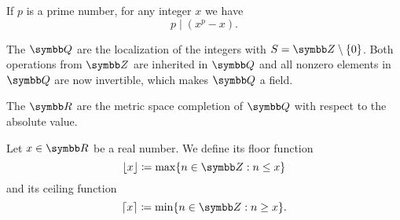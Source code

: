 \begin{proposition}\label{thm:fermats_little_theorem}
  If \( p \) is a prime number, for any integer \( x \) we have
  \begin{equation*}
    p \mid (x^p - x).
  \end{equation*}
\end{proposition}

\begin{definition}\label{def:rational_numbers}
  The  \( \Q \) are the localization of the integers with \( S = \Z \setminus \{ 0 \} \). Both operations from \( \Z \) are inherited in \( \Q \) and all nonzero elements in \( \Q \) are now invertible, which makes \( \Q \) a field.
\end{definition}

\begin{definition}\label{def:real_numbers}
  The  \( \R \) are the metric space completion of \( \Q \) with respect to the absolute value.
\end{definition}

\begin{definition}\label{def:floor_ceiling_functions}
  Let \( x \in \R \) be a real number. We define its floor function
  \begin{equation*}
    \lfloor x \rfloor \coloneqq \max \{ n \in \Z : n \leq x \}
  \end{equation*}
  and its ceiling function
  \begin{equation*}
    \lceil x \rceil \coloneqq \min \{ n \in \Z : n \geq x \}.
  \end{equation*}
\end{definition}

